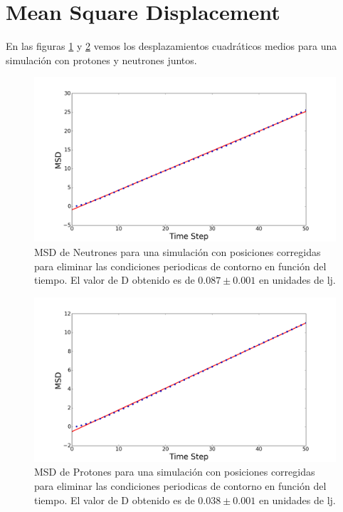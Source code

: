 \documentclass[
 reprint,
 amsmath,amssymb,
 aps,
 a4paper
]{revtex4-1}
\begin{document}
\section{\label{seq:msd}Mean Square Displacement}
En las figuras \ref{fig:msdneut} y \ref{fig:msdprot} vemos los desplazamientos cuadráticos medios para una simulación con protones y neutrones juntos.
\begin{figure}[H]
\centerline{
  \includegraphics[width=1.0\linewidth]{msdvst_neut.png}}
  \caption{\small MSD de Neutrones para una simulación con posiciones corregidas para eliminar las condiciones periodicas de contorno en función del tiempo. El valor de D obtenido es de $0.087 \pm 0.001$ en unidades de lj.}
  \label{fig:msdneut}
\end{figure}

\begin{figure}[H]
\centerline{
  \includegraphics[width=1.0\linewidth]{msdvst_prot.png}}
  \caption{\small MSD de Protones para una simulación con posiciones corregidas para eliminar las condiciones periodicas de contorno en función del tiempo. El valor de D obtenido es de $0.038 \pm 0.001$ en unidades de lj.}
  \label{fig:msdprot}
\end{figure}
\end{document}
